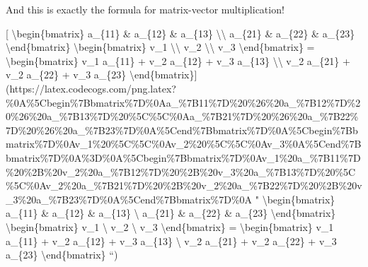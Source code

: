 \documentclass[]{article}
\begin{document}
And this is exactly the formula for matrix-vector multiplication!

{[} \textbackslash{}begin\{bmatrix\} a\_\{11\} \& a\_\{12\} \& a\_\{13\}
\textbackslash{}\textbackslash{} a\_\{21\} \& a\_\{22\} \& a\_\{23\}
\textbackslash{}end\{bmatrix\} \textbackslash{}begin\{bmatrix\} v\_1
\textbackslash{}\textbackslash{} v\_2 \textbackslash{}\textbackslash{} v\_3
\textbackslash{}end\{bmatrix\} = \textbackslash{}begin\{bmatrix\} v\_1 a\_\{11\}
+ v\_2 a\_\{12\} + v\_3 a\_\{13\} \textbackslash{}\textbackslash{} v\_2
a\_\{21\} + v\_2 a\_\{22\} + v\_3 a\_\{23\}
\textbackslash{}end\{bmatrix\}{]}(https://latex.codecogs.com/png.latex?\%0A\%5Cbegin\%7Bbmatrix\%7D\%0Aa\_\%7B11\%7D\%20\%26\%20a\_\%7B12\%7D\%20\%26\%20a\_\%7B13\%7D\%20\%5C\%5C\%0Aa\_\%7B21\%7D\%20\%26\%20a\_\%7B22\%7D\%20\%26\%20a\_\%7B23\%7D\%0A\%5Cend\%7Bbmatrix\%7D\%0A\%5Cbegin\%7Bbmatrix\%7D\%0Av\_1\%20\%5C\%5C\%0Av\_2\%20\%5C\%5C\%0Av\_3\%0A\%5Cend\%7Bbmatrix\%7D\%0A\%3D\%0A\%5Cbegin\%7Bbmatrix\%7D\%0Av\_1\%20a\_\%7B11\%7D\%20\%2B\%20v\_2\%20a\_\%7B12\%7D\%20\%2B\%20v\_3\%20a\_\%7B13\%7D\%20\%5C\%5C\%0Av\_2\%20a\_\%7B21\%7D\%20\%2B\%20v\_2\%20a\_\%7B22\%7D\%20\%2B\%20v\_3\%20a\_\%7B23\%7D\%0A\%5Cend\%7Bbmatrix\%7D\%0A
" \textbackslash{}begin\{bmatrix\} a\_\{11\} \& a\_\{12\} \& a\_\{13\}
\textbackslash{} a\_\{21\} \& a\_\{22\} \& a\_\{23\}
\textbackslash{}end\{bmatrix\} \textbackslash{}begin\{bmatrix\} v\_1
\textbackslash{} v\_2 \textbackslash{} v\_3 \textbackslash{}end\{bmatrix\} =
\textbackslash{}begin\{bmatrix\} v\_1 a\_\{11\} + v\_2 a\_\{12\} + v\_3
a\_\{13\} \textbackslash{} v\_2 a\_\{21\} + v\_2 a\_\{22\} + v\_3 a\_\{23\}
\textbackslash{}end\{bmatrix\} ``)
\end{document}
